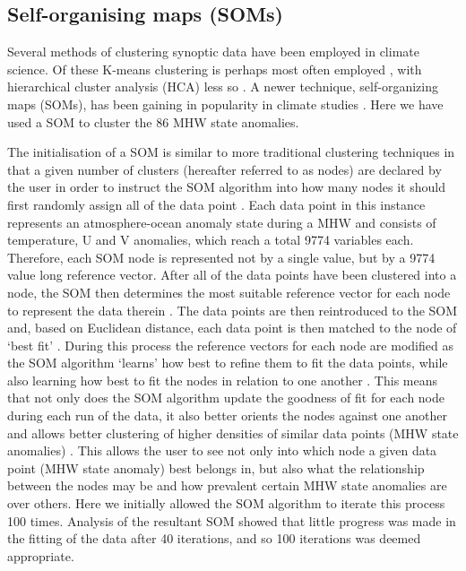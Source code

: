 \documentclass[utf8]{frontiersSCNS}
\begin{document}
\subsection{Self-organising maps (SOMs)}
Several methods of clustering synoptic data have been employed in climate science. Of these K-means clustering is perhaps most often employed \citep[e.g.][]{Corte-Real1998, Burrough2001, Kumar2011}, with hierarchical cluster analysis (HCA) less so \citep[e.g.][]{Unal2003}. A newer technique, self-organizing maps (SOMs), has been gaining in popularity in climate studies \citep[e.g.][]{Cavazos2000, Hewitson2002, Morioka2010}. Here we have used a SOM to cluster the 86 MHW state anomalies.

The initialisation of a SOM is similar to more traditional clustering techniques \citep[e.g.][]{Jain2010} in that a given number of clusters (hereafter referred to as nodes) are declared by the user in order to instruct the SOM algorithm into how many nodes it should first randomly assign all of the data point \citep{Hewitson2002}. Each data point in this instance represents an atmosphere-ocean anomaly state during a MHW and consists of temperature, U and V anomalies, which reach a total 9774 variables each. Therefore, each SOM node is represented not by a single value, but by a 9774 value long reference vector. After all of the data points have been clustered into a node, the SOM then determines the most suitable reference vector for each node to represent the data therein \citep{Hewitson2002}. The data points are then reintroduced to the SOM and, based on Euclidean distance, each data point is then matched to the node of `best fit' \citep{Hewitson2002}. During this process the reference vectors for each node are modified as the SOM algorithm `learns' how best to refine them to fit the data points, while also learning how best to fit the nodes in relation to one another \citep{Hewitson2002}. This means that not only does the SOM algorithm update the goodness of fit for each node during each run of the data, it also better orients the nodes against one another and allows better clustering of higher densities of similar data points (MHW state anomalies) \citep{Hewitson2002}. This allows the user to see not only into which node a given data point (MHW state anomaly) best belongs in, but also what the relationship between the nodes may be and how prevalent certain MHW state anomalies are over others. Here we initially allowed the SOM algorithm to iterate this process 100 times. Analysis of the resultant SOM showed that little progress was made in the fitting of the data after 40 iterations, and so 100 iterations was deemed appropriate.
\end{document}
